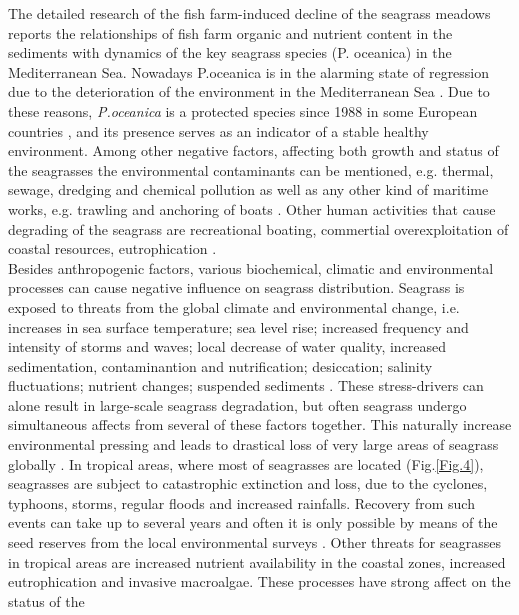\documentclass[10pt, a4paper]{article}
\begin{document}
The detailed research of the fish
farm-induced decline of the seagrass meadows \cite{Diaz-Almela06}\label{Diaz-Almela06}reports the relationships of
fish farm organic and nutrient content in the sediments with dynamics of the key seagrass species (P.
oceanica) in the Mediterranean Sea. Nowadays P.oceanica is in the alarming state of regression due
to the deterioration of the environment in the Mediterranean Sea \cite{Ribed02}\label{Ribed02}. Due to these reasons,
\textit{P.oceanica} is a protected species since 1988 in some European countries \cite{Francour99}\label{Francour99}, and
its presence serves as an indicator of a stable healthy environment. Among other negative factors,
affecting both growth and status of the seagrasses the environmental contaminants can be mentioned,
e.g. thermal, sewage, dredging and chemical pollution as well as any other kind of maritime works,
e.g. trawling and anchoring of boats \cite{Ribed02}\label{Ribed02}. Other human activities that cause degrading of the
seagrass are recreational boating, commertial overexploitation of coastal resources, eutrophication
\cite{McKenzie06}\label{McKenzie06}.\\
Besides anthropogenic factors, various biochemical, climatic and environmental processes can cause
negative influence on seagrass distribution. Seagrass is exposed to threats from the global climate and
environmental change, i.e. increases in sea surface temperature; sea level rise; increased frequency
and intensity of storms and waves; local decrease of water quality, increased sedimentation,
contaminantion and nutrification; desiccation; salinity fluctuations; nutrient changes; suspended
sediments \cite{Blake00}\label{Blake00}. These stress-drivers can alone result in large-scale seagrass
degradation, but often seagrass undergo simultaneous affects from several of these factors together.
This naturally increase environmental pressing and leads to drastical loss of very large areas of
seagrass globally \cite{Orth06}\label{Orth06}.
In tropical areas, where most of seagrasses are located (Fig.\ref{Fig.4}), seagrasses are subject to catastrophic
extinction and loss, due to the cyclones, typhoons, storms, regular floods and increased rainfalls. Recovery from such
events can take up to several years and often it is only possible by means of the seed reserves from the local
environmental surveys \cite{McKenzie07}\label{McKenzie07}. Other threats for seagrasses in tropical areas are 
increased nutrient availability in the coastal zones, increased
eutrophication and invasive macroalgae. These processes have strong affect on the status of the
\end{document}
